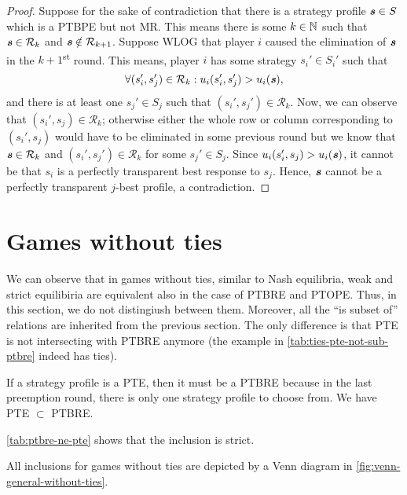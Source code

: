 \begin{proof}
	Suppose for the sake of contradiction that there is a strategy profile $\boldsymbol{\mathit{s}} \in S$ which is a PTBPE but not MR.
	This means there is some $k \in \mathbb{N}$ such that $\boldsymbol{\mathit{s}} \in \mathcal{R}_k$ and $\boldsymbol{\mathit{s}} \notin \mathcal{R}_{k+1}$.
	Suppose WLOG that player $i$ caused the elimination of $\boldsymbol{\mathit{s}}$ in the $k+1$\textsuperscript{st} round.
	This means, player $i$ has some strategy $s_i' \in S_i'$ such that
	\[
		\forall (s_i', s_j') \in \mathcal{R}_k: u_i(s_i', s_j') > u_i(\boldsymbol{\mathit{s}}),
	\]
	and there is at least one $s_j' \in S_j$ such that $(s_i', s_j') \in \mathcal{R}_k$.
	Now, we can observe that $(s_i', s_j) \in \mathcal{R}_k$; otherwise either the whole row or column corresponding to $(s_i', s_j)$ would have to be eliminated in some previous round but we know that $\boldsymbol{\mathit{s}} \in \mathcal{R}_k$ and $(s_i', s_j') \in \mathcal{R}_k$ for some $s_j' \in S_j$.
	Since $u_i(s_i', s_j) > u_i(\boldsymbol{\mathit{s}})$, it cannot be that $s_i$ is a perfectly transparent best response to $s_j$. Hence, $\boldsymbol{\mathit{s}}$ cannot be a perfectly transparent $j$-best profile, a contradiction.
\end{proof}


\section{Games without ties}
We can observe that in games without ties, similar to Nash equilibria, weak and strict equilibiria are equivalent also in the case of PTBRE and PTOPE.
Thus, in this section, we do not distingiush between them.
Moreover, all the \enquote{is subset of} relations are inherited from the previous section.
The only difference is that PTE is not intersecting with PTBRE anymore (the example in \autoref{tab:ties-pte-not-sub-ptbre} indeed has ties).

\begin{observation}
	\label{th:pte-subset-ptbre}
	If a strategy profile is a PTE, then it must be a PTBRE because in the last preemption round, there is only one strategy profile to choose from.
	We have PTE $\subset$ PTBRE.
\end{observation}

\begin{remark}
	\autoref{tab:ptbre-ne-pte} shows that the inclusion is strict.
\end{remark}

All inclusions for games without ties are depicted by a Venn diagram in \autoref{fig:venn-general-without-ties}.

